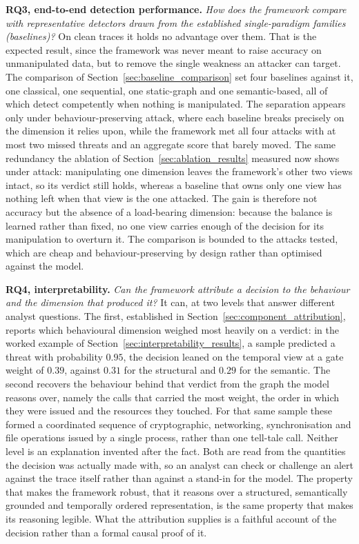 \documentclass[%
    BCOR=10mm,
    DIV=13,
    toc=bibliography,
    toc=listof,
    oneside,
    12pt,
]{scrbook}
\begin{document}
\textbf{RQ3, end-to-end detection performance.} \emph{How does the framework compare
with representative detectors drawn from the established single-paradigm families
(baselines)?} On clean traces it holds no advantage over them. That is the expected
result, since the framework was never meant to raise accuracy on unmanipulated data,
but to remove the single weakness an attacker can target. The
comparison of Section~\ref{sec:baseline_comparison} set four baselines against it, one
classical, one sequential, one static-graph and one semantic-based, all of which
detect competently when nothing is manipulated. The separation appears only under
behaviour-preserving attack, where each baseline breaks precisely on the dimension it
relies upon, while the framework met all four attacks with at most two missed threats
and an aggregate score that barely moved. The same redundancy the ablation of
Section~\ref{sec:ablation_results} measured now shows under attack: manipulating one
dimension leaves the framework's other two views intact, so its verdict still holds,
whereas a baseline that owns only one view has nothing left when that view is the one
attacked. The gain is therefore not accuracy but the absence of a load-bearing
dimension: because the balance is learned rather than fixed, no one view carries
enough of the decision for its manipulation to overturn it. The
comparison is bounded to the attacks tested, which are cheap and behaviour-preserving
by design rather than optimised against the model.

\textbf{RQ4, interpretability.} \emph{Can the framework attribute a decision to the
behaviour and the dimension that produced it?} It can, at two levels that answer
different analyst questions. The first, established in
Section~\ref{sec:component_attribution}, reports which behavioural dimension weighed
most heavily on a verdict: in the worked example of
Section~\ref{sec:interpretability_results}, a sample predicted a threat with
probability $0.95$, the decision leaned on the temporal view at a gate weight of
$0.39$, against $0.31$ for the structural and $0.29$ for the semantic. The second
recovers the behaviour behind that verdict from the graph the model reasons over,
namely the calls that carried the most weight, the order in which they were issued and
the resources they touched. For that same sample these formed a coordinated sequence
of cryptographic, networking, synchronisation and file operations issued by a single
process, rather than one tell-tale call. Neither level is an explanation invented
after the fact. Both are read from the quantities the decision was actually made with,
so an analyst can check or challenge an alert against the trace itself rather than
against a stand-in for the model. The property that makes the
framework robust, that it reasons over a structured, semantically grounded and
temporally ordered representation, is the same property that makes its reasoning
legible. What the attribution supplies is a faithful account of the decision rather
than a formal causal proof of it.
\end{document}
